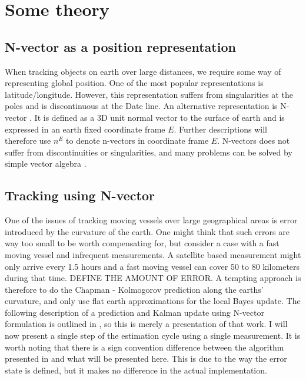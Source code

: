 \section{Some theory}
\label{sec:nvector}

\subsection{N-vector as a position representation}
When tracking objects on earth over large distances, we require some way of representing global position. One of the most popular representations is latitude/longitude. However, this representation suffers from singularities at the poles and is discontinuous at the Date line. An alternative representation is N-vector \parencite{k_gade_2010}. It is defined as a 3D unit normal vector to the surface of earth and is expressed in an earth fixed coordinate frame $E$. Further descriptions will therefore use $n^E$ to denote n-vectors in coordinate frame $E$. N-vectors does not suffer from discontinuities or singularities, and many problems can be solved by simple vector algebra \parencite{k_gade_2010}. 

\subsection{Tracking using N-vector}
\label{sec:tracking_n_vector}
One of the issues of tracking moving vessels over large geographical areas is error introduced by the curvature of the earth. One might think that such errors are way too small to be worth compensating for, but consider a case with a fast moving vessel and infrequent measurements. A satellite based measurement might only arrive every 1.5 hours and a fast moving vessel can cover 50 to 80 kilometers during that time. DEFINE THE AMOUNT OF ERROR. A tempting approach is therefore to do the Chapman - Kolmogorov prediction along the earths' curvature, and only use flat earth approximations for the local Bayes update. The following description of a prediction and Kalman update using N-vector formulation is outlined in \parencite{b_gade_2024}, so this is merely a presentation of that work. I will now present a single step of the estimation cycle using a single measurement. It is worth noting that there is a sign convention difference between the algorithm presented in \parencite{b_gade_2024} and what will be presented here. This is due to the way the error state is defined, but it makes no difference in the actual implementation.
\medskip

